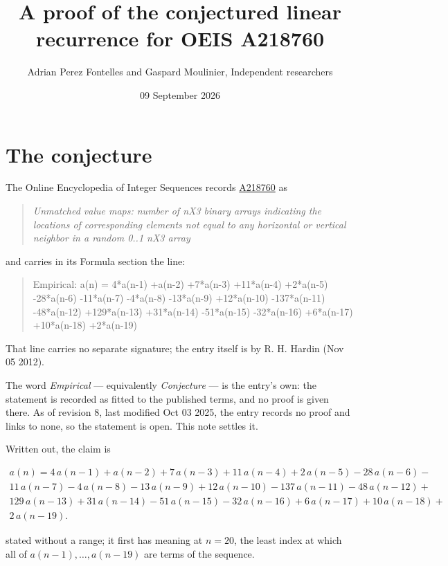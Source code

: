 \documentclass[11pt]{article}
\title{A proof of the conjectured linear recurrence for OEIS A218760}
\author{Adrian Perez Fontelles and Gaspard Moulinier, Independent researchers}
\date{09 September 2026}
\theoremstyle{definition}
\begin{document}
\maketitle
\section{The conjecture}

The Online Encyclopedia of Integer Sequences records \href{https://oeis.org/A218760}{A218760} as

\begin{quote}\itshape Unmatched value maps: number of nX3 binary arrays indicating the locations of corresponding elements not equal to any horizontal or vertical neighbor in a random 0..1 nX3 array\end{quote}

and carries in its Formula section the line:

\begin{quote}\ttfamily Empirical: a(n) = 4*a(n-1) +a(n-2) +7*a(n-3) +11*a(n-4) +2*a(n-5) -28*a(n-6) -11*a(n-7) -4*a(n-8) -13*a(n-9) +12*a(n-10) -137*a(n-11) -48*a(n-12) +129*a(n-13) +31*a(n-14) -51*a(n-15) -32*a(n-16) +6*a(n-17) +10*a(n-18) +2*a(n-19)\end{quote}

That line carries no separate signature; the entry itself is by R. H. Hardin (Nov 05 2012).

The word {\itshape Empirical} --- equivalently {\itshape Conjecture} --- is the entry's own: the statement is recorded as fitted to the published terms, and no proof is given there. As of revision 8, last modified Oct 03 2025, the entry records no proof and links to none, so the statement is open. This note settles it.

Written out, the claim is

\begin{multline*} a(n) = 4\,a(n-1) + a(n-2) + 7\,a(n-3) + 11\,a(n-4) + 2\,a(n-5) - 28\,a(n-6) - \\ 11\,a(n-7) - 4\,a(n-8) - 13\,a(n-9) + 12\,a(n-10) - 137\,a(n-11) - 48\,a(n-12) + \\ 129\,a(n-13) + 31\,a(n-14) - 51\,a(n-15) - 32\,a(n-16) + 6\,a(n-17) + 10\,a(n-18) + \\ 2\,a(n-19). \end{multline*}

stated without a range; it first has meaning at $n = 20$, the least index at which all of $a(n-1),\dots,a(n-19)$ are terms of the sequence.
\end{document}
